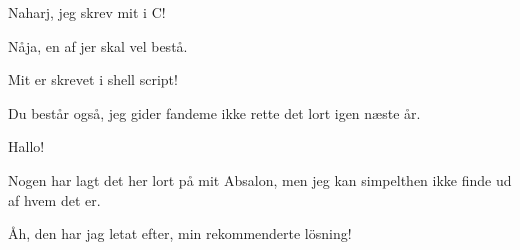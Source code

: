 \documentclass[a4paper,11pt]{article}
\begin{document}
\begin{sketch}

     Naharj, jeg skrev mit i C!


     Nåja, en af jer skal vel bestå.


     Mit er skrevet i shell script!


     Du består også, jeg gider fandeme ikke rette det lort
    igen næste år.


     Hallo!

     Nogen har lagt det her lort på mit Absalon, men jeg kan
    simpelthen ikke finde ud af hvem det er.


     Åh, den har jag letat efter, min rekommenderte lösning!


  \end{sketch}
\end{document}
